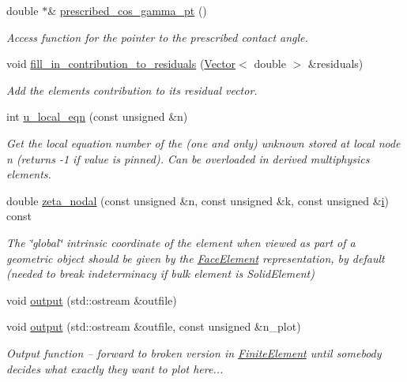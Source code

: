 \begin{DoxyCompactItemize}
double $\ast$\& \hyperlink{classoomph_1_1YoungLaplaceContactAngleElement_aa93c0c35fd02e9aacf77695efdf25816}{prescribed\+\_\+cos\+\_\+gamma\+\_\+pt} ()
\begin{DoxyCompactList}\small\item\em Access function for the pointer to the prescribed contact angle. \end{DoxyCompactList}\item 
void \hyperlink{classoomph_1_1YoungLaplaceContactAngleElement_a58e1367abd5655dafc45749cc92a5ce3}{fill\+\_\+in\+\_\+contribution\+\_\+to\+\_\+residuals} (\hyperlink{classoomph_1_1Vector}{Vector}$<$ double $>$ \&residuals)
\begin{DoxyCompactList}\small\item\em Add the element\textquotesingle{}s contribution to its residual vector. \end{DoxyCompactList}\item 
int \hyperlink{classoomph_1_1YoungLaplaceContactAngleElement_a0469df9bf4d8888312929e66821dc408}{u\+\_\+local\+\_\+eqn} (const unsigned \&n)
\begin{DoxyCompactList}\small\item\em Get the local equation number of the (one and only) unknown stored at local node n (returns -\/1 if value is pinned). Can be overloaded in derived multiphysics elements. \end{DoxyCompactList}\item 
double \hyperlink{classoomph_1_1YoungLaplaceContactAngleElement_ac6e3f26da35682eb715693755b661a5c}{zeta\+\_\+nodal} (const unsigned \&n, const unsigned \&k, const unsigned \&\hyperlink{cfortran_8h_adb50e893b86b3e55e751a42eab3cba82}{i}) const
\begin{DoxyCompactList}\small\item\em The \char`\"{}global\char`\"{} intrinsic coordinate of the element when viewed as part of a geometric object should be given by the \hyperlink{classoomph_1_1FaceElement}{Face\+Element} representation, by default (needed to break indeterminacy if bulk element is Solid\+Element) \end{DoxyCompactList}\item 
void \hyperlink{classoomph_1_1YoungLaplaceContactAngleElement_afc1ae43e1b279e52c7d3a030f1740d93}{output} (std\+::ostream \&outfile)
\item 
void \hyperlink{classoomph_1_1YoungLaplaceContactAngleElement_a16968ee7e86d676783b07400a4afc61d}{output} (std\+::ostream \&outfile, const unsigned \&n\+\_\+plot)
\begin{DoxyCompactList}\small\item\em Output function -- forward to broken version in \hyperlink{classoomph_1_1FiniteElement}{Finite\+Element} until somebody decides what exactly they want to plot here... \end{DoxyCompactList}\item 

\end{DoxyCompactItemize}
